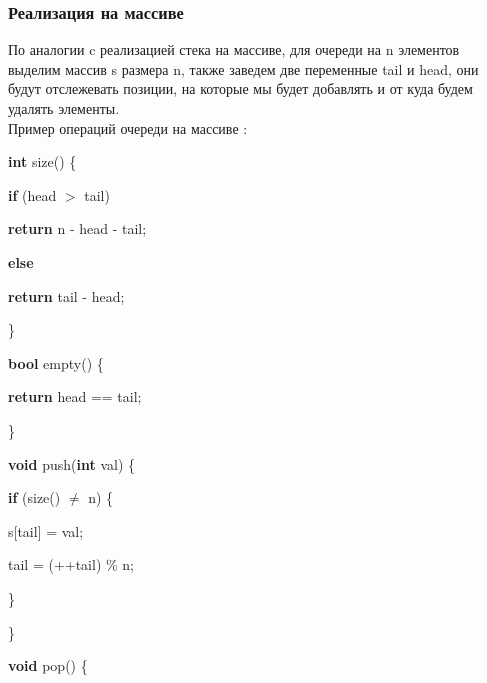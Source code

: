 \subsubsection{Реализация на массиве}
По аналогии c реализацией стека на массиве, для очереди на n элементов выделим массив s размера n, также заведем две переменные tail и head, они будут отслежевать позиции, на которые мы будет добавлять и от куда будем удалять элементы.\\

Пример операций очереди на массиве :
\begin{algorithm}
	\begin{algorithmic}

		\State \textbf{int} size() \{

		\State \hspace{1cm} \textbf{if} (head $>$ tail)

		\State \hspace{2cm} \textbf{return} n - head - tail;

		\State \hspace{1cm} \textbf{else}

		\State \hspace{2cm} \textbf{return} tail - head;

		\State \}

		\vspace{0.5cm}

		\State \textbf{bool} empty() \{

		\State \hspace{1cm} \textbf{return} head == tail;

		\State \}

		\vspace{0.5cm}

		\State \textbf{void} push(\textbf{int} val) \{

		\State \hspace{1cm} \textbf{if} (size() $\neq$ n) \{

		\State \hspace{2cm} s[tail] = val;

		\State \hspace{2cm} tail = (++tail) \% n;

		\State \hspace{1cm} \}

		\State \}

		\vspace{0.5cm}

		\State \textbf{void} pop() \{


\end{algorithmic}
\end{algorithm}
